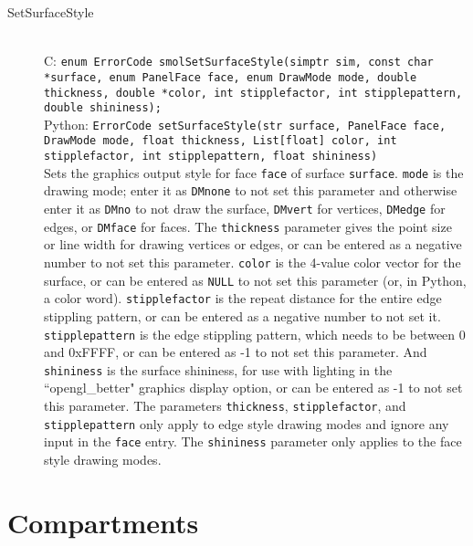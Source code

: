 \documentclass {book}
\begin{document}
\begin{description}
\item[SetSurfaceStyle]
\hfill \\
C: \texttt{enum ErrorCode smolSetSurfaceStyle(simptr sim, const char *surface, enum PanelFace face, enum DrawMode mode, double thickness, double *color, int stipplefactor, int stipplepattern, double shininess);}\\
Python: \texttt{ErrorCode setSurfaceStyle(str surface, PanelFace face, DrawMode mode, float thickness, List[float] color, int stipplefactor, int stipplepattern, float shininess)}\\
Sets the graphics output style for face \texttt{face} of surface \texttt{surface}. \texttt{mode} is the drawing mode; enter it as \texttt{DMnone} to not set this parameter and otherwise enter it as \texttt{DMno} to not draw the surface, \texttt{DMvert} for vertices, \texttt{DMedge} for edges, or \texttt{DMface} for faces. The \texttt{thickness} parameter gives the point size or line width for drawing vertices or edges, or can be entered as a negative number to not set this parameter. \texttt{color} is the 4-value color vector for the surface, or can be entered as \texttt{NULL} to not set this parameter (or, in Python, a color word). \texttt{stipplefactor} is the repeat distance for the entire edge stippling pattern, or can be entered as a negative number to not set it. \texttt{stipplepattern} is the edge stippling pattern, which needs to be between 0 and 0xFFFF, or can be entered as -1 to not set this parameter. And \texttt{shininess} is the surface shininess, for use with lighting in the ``opengl\_better" graphics display option, or can be entered as -1 to not set this parameter. The parameters \texttt{thickness}, \texttt{stipplefactor}, and \texttt{stipplepattern} only apply to edge style drawing modes and ignore any input in the \texttt{face} entry. The \texttt{shininess} parameter only applies to the face style drawing modes.

\end{description}

\section{Compartments}
\end{document}
